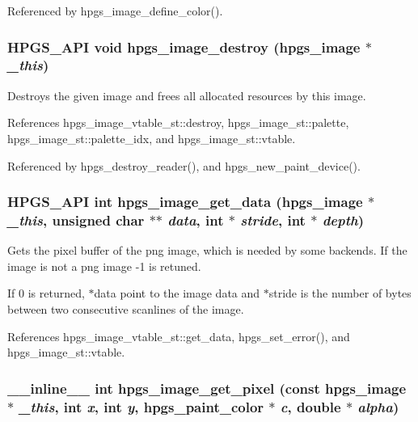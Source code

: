 Referenced by hpgs\_\-image\_\-define\_\-color().
\subsubsection[hpgs\_\-image\_\-destroy]{\setlength{\rightskip}{0pt plus 5cm}HPGS\_\-API void hpgs\_\-image\_\-destroy ({\bf hpgs\_\-image} $\ast$ {\em \_\-this})}\label{group__image_g0be15914a56178078fc488e254949cc7}


Destroys the given image and frees all allocated resources by this image. 

References hpgs\_\-image\_\-vtable\_\-st::destroy, hpgs\_\-image\_\-st::palette, hpgs\_\-image\_\-st::palette\_\-idx, and hpgs\_\-image\_\-st::vtable.

Referenced by hpgs\_\-destroy\_\-reader(), and hpgs\_\-new\_\-paint\_\-device().
\subsubsection[hpgs\_\-image\_\-get\_\-data]{\setlength{\rightskip}{0pt plus 5cm}HPGS\_\-API int hpgs\_\-image\_\-get\_\-data ({\bf hpgs\_\-image} $\ast$ {\em \_\-this}, \/  unsigned char $\ast$$\ast$ {\em data}, \/  int $\ast$ {\em stride}, \/  int $\ast$ {\em depth})}\label{group__image_g2240c492d0f359a24e3d01c5eff70a3b}


Gets the pixel buffer of the png image, which is needed by some backends. If the image is not a png image -1 is retuned.

If 0 is returned, $\ast$data point to the image data and $\ast$stride is the number of bytes between two consecutive scanlines of the image. 

References hpgs\_\-image\_\-vtable\_\-st::get\_\-data, hpgs\_\-set\_\-error(), and hpgs\_\-image\_\-st::vtable.
\subsubsection[hpgs\_\-image\_\-get\_\-pixel]{\setlength{\rightskip}{0pt plus 5cm}\_\-\_\-inline\_\-\_\- int hpgs\_\-image\_\-get\_\-pixel (const {\bf hpgs\_\-image} $\ast$ {\em \_\-this}, \/  int {\em x}, \/  int {\em y}, \/  {\bf hpgs\_\-paint\_\-color} $\ast$ {\em c}, \/  double $\ast$ {\em alpha})\hspace{0.3cm}{\tt  [static]}}\label{group__image_g05c2b3b1f31abd151367019a8353f1f6}


